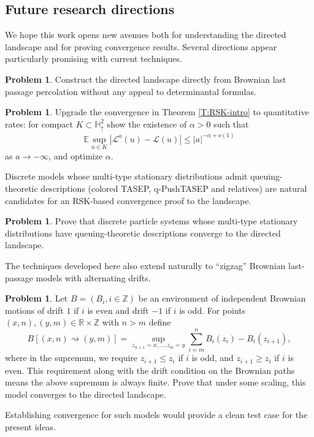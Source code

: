 \documentclass[11pt]{article}
\newcommand{\Z}{\mathbb{Z}}
\newcommand{\R}{\mathbb{R}}
\newcommand{\X}{\times}
\theoremstyle{definition} %
\newtheorem{problem}[theorem]{Problem}
\theoremstyle{remark} %
\begin{document}
\subsection{Future research directions}

We hope this work opens new avenues both for understanding the directed landscape and for proving convergence results. Several directions appear particularly promising with current techniques.

\begin{problem}
Construct the directed landscape directly from Brownian last passage percolation without any appeal to determinantal formulas.
\end{problem}

\begin{problem}
Upgrade the convergence in Theorem \ref{T:RSK-intro} to quantitative rates: for compact \(K\subset\mathbb{H}^2_\uparrow\) show the existence of \(\alpha>0\) such that
\[
\mathbb{E}\sup_{u\in K}|\mathcal{L}^a(u)-\mathcal{L}(u)|\le |a|^{-\alpha+o(1)}
\]
as \(a\to-\infty\), and optimize \(\alpha\).
\end{problem}

Discrete models whose multi-type stationary distributions admit queuing-theoretic descriptions (colored TASEP, q-PushTASEP and relatives) are natural candidates for an RSK-based convergence proof to the landscape. 
\begin{problem}
\label{P:problem-three}
Prove that discrete particle systems whose multi-type stationary distributions have queuing-theoretic descriptions converge to the directed landscape.
\end{problem}

The techniques developed here also extend naturally to ``zigzag'' Brownian last-passage models with alternating drifts. 

\begin{problem}
\label{P:problem-four}
Let $B = (B_i, i \in \Z)$ be an environment of independent Brownian motions of drift $1$ if $i$ is even and drift $-1$ if $i$ is odd. For points $(x, n), (y, m) \in \R \X \Z$ with $n > m$ define
$$
B[(x, n) \rightsquigarrow (y, m)] = \sup_{z_{n+1} = x, \dots, z_m = y} \sum_{i=m}^n B_i(z_i) - B_i(z_{i+1}),
$$
where in the supremum, we require $z_{i+1} \le z_i$ if $i$ is odd, and $z_{i+1} \ge z_i$ if $i$ is even. This requirement along with the drift condition on the Brownian paths means the above supremum is always finite.
Prove that under some scaling, this model converges to the directed landscape.
\end{problem}
Establishing convergence for such models would provide a clean test case for the present ideas.
\end{document}
